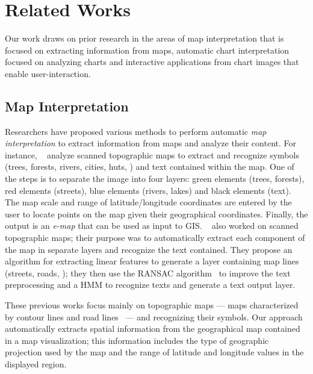\chapter{Related Works}
\label{ch:relatedWorks}
Our work draws on prior research in the areas of map interpretation that is focused on extracting information from maps, automatic chart interpretation focused on analyzing charts and interactive applications from chart images that enable user-interaction.


\section{Map Interpretation}
\label{sec:mapInterpretation}
Researchers have proposed various methods to perform automatic \textit{map interpretation} \citep{Walter2011} to extract information from maps and analyze their content. For instance, \citeauthor{Dhar2006}~\citep{Dhar2006} analyze scanned topographic maps to extract and recognize symbols (\eg trees, forests, rivers, cities, huts, \etc) and text contained within the map. One of the steps is to separate the image into four layers: green elements (trees, forests), red elements (streets), blue elements (rivers, lakes) and black elements (text). The map scale and range of latitude/longitude coordinates are entered by the user to locate points on the map given their geographical coordinates. Finally, the output is an \textit{e-map} that can be used as input to \ac{GIS}. \citeauthor{Pezeshk2011}~\citep{Pezeshk2011} also worked on scanned topographic maps; their purpose was to automatically extract each component of the map in separate layers and recognize the text contained. They propose an algorithm for extracting linear features to generate a layer containing map lines (streets, roads, \etc); they then use the RANSAC algorithm~\citep{Fischler1981} to improve the text preprocessing and a \ac{HMM} to recognize texts and generate a text output layer.

These previous works focus mainly on topographic maps --- \ie maps characterized by contour lines and road lines~\citep{Pezeshk2011} --- and recognizing their symbols. Our approach automatically extracts spatial information from the geographical map contained in a map visualization; this information includes the type of geographic projection used by the map and the range of latitude and longitude values in the displayed region.


